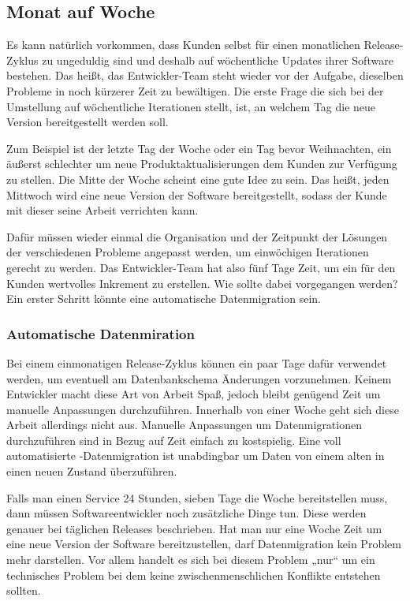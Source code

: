 \subsection{Monat auf Woche}
\label{subsec:monat-auf-woche}

Es kann natürlich vorkommen, dass Kunden selbst für einen monatlichen Release-Zyklus zu ungeduldig sind und deshalb auf wöchentliche Updates ihrer Software bestehen. Das heißt, das Entwickler-Team steht wieder vor der Aufgabe, dieselben Probleme in noch kürzerer Zeit zu bewältigen. Die erste Frage die sich bei der Umstellung auf wöchentliche Iterationen stellt, ist, an welchem Tag die neue Version bereitgestellt werden soll.

Zum Beispiel ist der letzte Tag der Woche oder ein Tag bevor Weihnachten, ein äußerst schlechter um neue Produktaktualisierungen dem Kunden zur Verfügung zu stellen. Die Mitte der Woche scheint eine gute Idee zu sein. Das heißt, jeden Mittwoch wird eine neue Version der Software bereitgestellt, sodass der Kunde mit dieser seine Arbeit verrichten kann. 

Dafür müssen wieder einmal die Organisation und der Zeitpunkt der Lösungen der verschiedenen Probleme angepasst werden, um einwöchigen Iterationen gerecht zu werden. Das Entwickler-Team hat also fünf Tage Zeit, um ein für den Kunden wertvolles Inkrement zu erstellen. Wie sollte dabei vorgegangen werden? Ein erster Schritt könnte eine automatische Datenmigration sein.

\subsubsection{Automatische Datenmiration}

Bei einem einmonatigen Release-Zyklus können ein paar Tage dafür verwendet werden, um eventuell am Datenbankschema Änderungen vorzunehmen. Keinem Entwickler macht diese Art von Arbeit Spaß, jedoch bleibt genügend Zeit um manuelle Anpassungen durchzuführen. Innerhalb von einer Woche geht sich diese Arbeit allerdings nicht aus. Manuelle Anpassungen um Datenmigrationen durchzuführen sind in Bezug auf Zeit einfach zu kostspielig. Eine voll automatisierte -Datenmigration ist unabdingbar um Daten von einem alten in einen neuen Zustand überzuführen. 

Falls man einen Service 24 Stunden, sieben Tage die Woche bereitstellen muss, dann müssen Softwareentwickler noch zusätzliche Dinge tun. Diese werden genauer bei täglichen Releases beschrieben. Hat man nur eine Woche Zeit um eine neue Version der Software bereitzustellen, darf Datenmigration kein Problem mehr darstellen. Vor allem handelt es sich bei diesem Problem „nur“ um ein  technisches Problem bei dem keine zwischenmenschlichen Konflikte entstehen sollten. 

